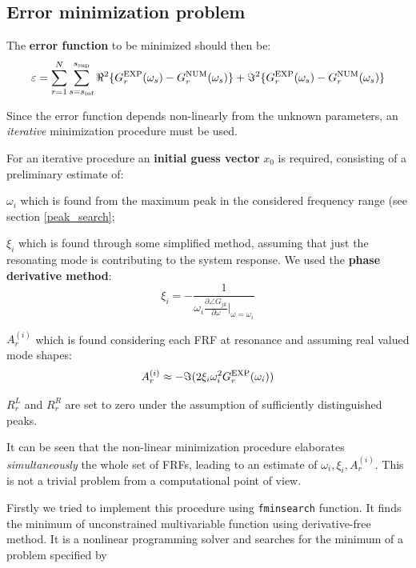 \documentclass[a4paper,12pt,oneside]{article}
\begin{document}
\subsection{Error minimization problem}

The \textbf{error function} to be minimized should then be:
\begin{equation}
\label{eqn:error_fun} 
	\varepsilon = 
		\sum_{r=1}^{N}
		\sum_{s=s_\textup{inf}}^{s_\textup{sup}}
		\Re^2\{G^\textup{EXP}_r(\omega_s) - G^\textup{NUM}_r(\omega_s)\} +
		\Im^2\{G^\textup{EXP}_r(\omega_s) - G^\textup{NUM}_r(\omega_s)\}
\end{equation}

Since the error function depends non-linearly from the unknown parameters, an \textsl{iterative} minimization procedure must be used.

For an iterative procedure an \textbf{initial guess vector} $ x_0 $ is required, consisting of a preliminary estimate of:

\begin{list}{}
	\item $ \omega_i $  which is found from the maximum peak in the considered frequency range (see section \ref{peak_search};
	\item $ \xi_i $ which is found through some simplified method, assuming that just the
resonating mode is contributing to the system response. We used the \textbf{phase derivative method}:
		\[
			\xi_i = - \frac{1}{\omega_i \frac{\partial \angle G_{jk}}{\partial \omega}\big|_{\omega =
				\omega_i}}
		\]
 
	\item $ A_r^{(i)} $ which is found considering each FRF at resonance and assuming real valued mode shapes:
\[
	A_r^{(i)} \approx - \Im (2 \xi_i \omega_i^2 G_r^\textup{EXP}(\omega_i))
\]
	\item $ R_r^L $ and $ R_r^R $ are set to zero under the assumption of sufficiently distinguished peaks.
\end{list}

It can be seen that the non-linear minimization procedure elaborates \textsl{simultaneously} the whole set of FRFs, leading to an estimate of $ \omega_i, \xi_i, A^{(i)}_r $.
This is not a trivial problem from a computational point of view.

Firstly we tried to implement this procedure using \lstinline!fminsearch! function. It finds the minimum of unconstrained multivariable function using derivative-free method. It is a nonlinear programming solver and searches for the minimum of a problem specified by
\end{document}
